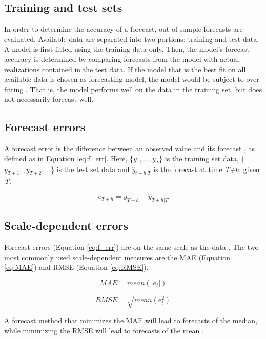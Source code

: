 \subsection{Training and test sets}
In order to determine the accuracy of a forecast, out-of-sample forecasts are evaluated. Available data are separated into two portions: training and test data. A model is first fitted using the training data only. Then, the model's forecast accuracy is determined by comparing forecasts from the model with actual realizations contained in the test data. 
If the model that is the best fit on all available data is chosen as forecasting model, the model would be subject to over-fitting \citep{Hyndman}. That is, the model performs well on the data in the training set, but does not necessarily forecast well.

\subsection{Forecast errors}
A forecast error is the difference between an observed value and its forecast \citep{Hyndman}, as defined as in Equation \ref{eq:f_err}. Here, \{$ y_{1},...,y_{T} $\} is the training set data, \{$ y_{T+1},,y_{T+2},...$\} is the test set data and $\hat{y}_{t+h|T}$ is the forecast at time \textit{T+h}, given \textit{T}. 

\begin{equation}\label{eq:f_err}
    e_{T+h} = y_{T+h} - \hat{y}_{T+h|T}
\end{equation}

\subsection{Scale-dependent errors}

Forecast errors (Equation \ref{eq:f_err}) are on the same scale as the data \citep{Hyndman}. The two most commonly used scale-dependent measures are the MAE (Equation \ref{eq:MAE}) and RMSE (Equation \ref{eq:RMSE}).

\begin{equation}\label{eq:MAE}
    MAE = mean(|e_t|)
\end{equation}

\begin{equation}\label{eq:RMSE}
    RMSE = \sqrt{mean(e_t^2)}
\end{equation}


 A forecast method that minimizes the MAE will lead to forecasts of the median, while minimizing the RMSE will lead to forecasts of the mean \citep{Hyndman}. 
 
